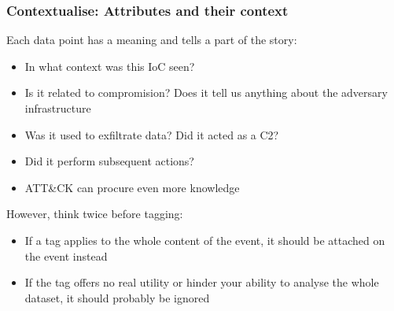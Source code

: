 \begin{frame}
    \frametitle{Contextualise: Attributes and their context}
    Each data point has a meaning and tells a part of the story:
    \begin{itemize}
        \item In what context was this IoC seen?
        \item Is it related to compromision? Does it tell us anything about the adversary infrastructure
        \item Was it used to exfiltrate data? Did it acted as a C2?
        \item Did it perform subsequent actions?
        \item ATT&CK can procure even more knowledge
    \end{itemize}

    However, think twice before tagging:
    \begin{itemize}
        \item If a tag applies to the whole content of the event, it should be attached on the event instead
        \item If the tag offers no real utility or hinder your ability to analyse the whole dataset, it should probably be ignored
    \end{itemize}
\end{frame}

